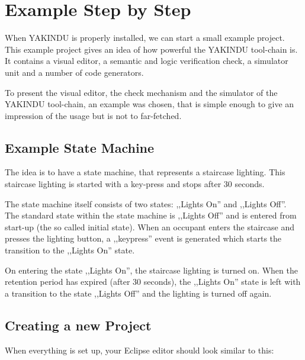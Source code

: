 \pagebreak
\section{Example Step by Step}

When YAKINDU is properly installed, we can start a small example project. This
example project gives an idea of how powerful the YAKINDU tool-chain is. It
contains a visual editor, a semantic and logic verification check, a simulator
unit and a number of code generators.

To present the visual editor, the check mechanism and the simulator of the
YAKINDU tool-chain, an example was chosen, that is simple enough to give an
impression of the usage but is not to far-fetched.

\subsection{Example State Machine}

The idea is to have a state machine, that represents a staircase lighting. This
staircase lighting is started with a key-press and stops after 30 seconds.

The state machine itself consists of two states: ,,Lights On'' and ,,Lights
Off''. The standard state within the state machine is ,,Lights Off'' and is
entered from start-up (the so called initial state). When an occupant enters the
staircase and presses the lighting button, a ,,keypress'' event is generated
which starts the transition to the ,,Lights On'' state.

On entering the state ,,Lights On'', the staircase lighting is turned on. When
the retention period has expired (after 30 seconds), the ,,Lights On'' state is
left with a transition to the state ,,Lights Off'' and the lighting is turned off
again.

\subsection{Creating a new Project}

When everything is set up, your Eclipse editor should look similar to this:

